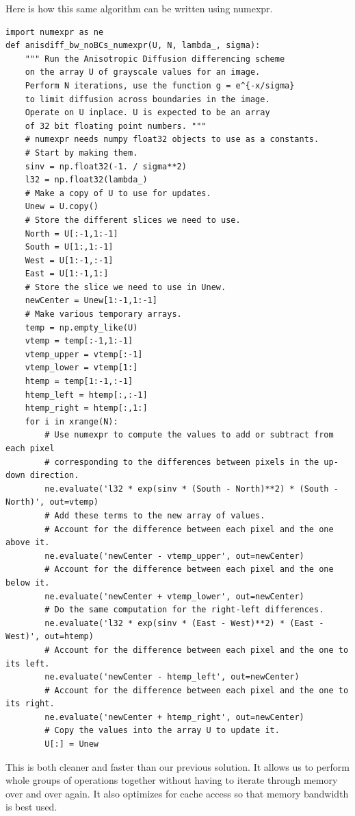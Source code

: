 Here is how this same algorithm can be written using numexpr.
\begin{lstlisting}
import numexpr as ne
def anisdiff_bw_noBCs_numexpr(U, N, lambda_, sigma):
    """ Run the Anisotropic Diffusion differencing scheme
    on the array U of grayscale values for an image.
    Perform N iterations, use the function g = e^{-x/sigma}
    to limit diffusion across boundaries in the image.
    Operate on U inplace. U is expected to be an array
    of 32 bit floating point numbers. """
    # numexpr needs numpy float32 objects to use as a constants.
    # Start by making them.
    sinv = np.float32(-1. / sigma**2)
    l32 = np.float32(lambda_)
    # Make a copy of U to use for updates.
    Unew = U.copy()
    # Store the different slices we need to use.
    North = U[:-1,1:-1]
    South = U[1:,1:-1]
    West = U[1:-1,:-1]
    East = U[1:-1,1:]
    # Store the slice we need to use in Unew.
    newCenter = Unew[1:-1,1:-1]
    # Make various temporary arrays.
    temp = np.empty_like(U)
    vtemp = temp[:-1,1:-1]
    vtemp_upper = vtemp[:-1]
    vtemp_lower = vtemp[1:]
    htemp = temp[1:-1,:-1]
    htemp_left = htemp[:,:-1]
    htemp_right = htemp[:,1:]
    for i in xrange(N):
        # Use numexpr to compute the values to add or subtract from each pixel
        # corresponding to the differences between pixels in the up-down direction.
        ne.evaluate('l32 * exp(sinv * (South - North)**2) * (South - North)', out=vtemp)
        # Add these terms to the new array of values.
        # Account for the difference between each pixel and the one above it.
        ne.evaluate('newCenter - vtemp_upper', out=newCenter)
        # Account for the difference between each pixel and the one below it.
        ne.evaluate('newCenter + vtemp_lower', out=newCenter)
        # Do the same computation for the right-left differences.
        ne.evaluate('l32 * exp(sinv * (East - West)**2) * (East - West)', out=htemp)
        # Account for the difference between each pixel and the one to its left.
        ne.evaluate('newCenter - htemp_left', out=newCenter)
        # Account for the difference between each pixel and the one to its right.
        ne.evaluate('newCenter + htemp_right', out=newCenter)
        # Copy the values into the array U to update it.
        U[:] = Unew
\end{lstlisting}
This is both cleaner and faster than our previous solution.
It allows us to perform whole groups of operations together without having to iterate through memory over and over again.
It also optimizes for cache access so that memory bandwidth is best used.

